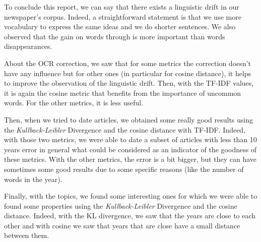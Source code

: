 To conclude this report, we can say that there exists a linguistic drift in our newspaper's corpus. Indeed, a straightforward statement is that we use more vocabulary to express the same ideas and we do shorter sentences. We also observed that the gain on words through is more important than words disappearances.

About the OCR correction, we saw that for some metrics the correction doesn't have any influence but for other ones (in particular for cosine distance), it helps to improve the observation of the linguistic drift. Then, with the TF-IDF values, it is again the cosine metric that benefits from the importance of uncommon words. For the other metrics, it is less useful.

Then, when we tried to date articles, we obtained some really good results using the \emph{Kullback-Leibler} Divergence and the cosine distance with TF-IDF. Indeed, with those two metrics, we were able to date a subset of articles with less than 10 years error in general what could be considered as an indicator of the goodness of these metrics. With the other metrics, the error is a bit bigger, but they can have sometimes some good results due to some specific reasons (like the number of words in the year).

Finally, with the topics, we found some interesting ones for which we were able to found some properties using the \emph{Kullback-Leibler} Divergence and the cosine distance. Indeed, with the KL divergence, we saw that the years are close to each other and with cosine we saw that years that are close have a small distance between them.
